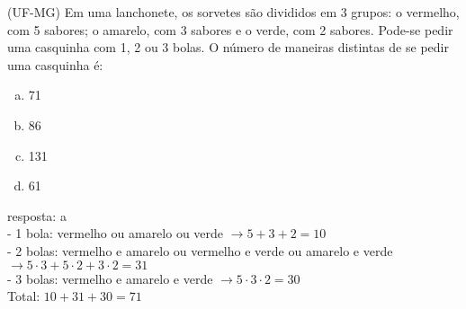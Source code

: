 \begin{ex}
 (UF-MG) Em uma lanchonete, os sorvetes são divididos em 3 grupos: o vermelho, com 5 sabores; o amarelo, com 3 sabores e o verde, com 2 sabores. Pode-se pedir uma casquinha com 1, 2 ou 3 bolas. O número de maneiras distintas de se pedir uma casquinha é:
    \begin{enumerate}[(a)]
    \item 71
    \item 86
    \item 131
    \item 61
    \end{enumerate}
      \begin{sol}
      resposta: a \\  
      - 1 bola: vermelho ou amarelo ou verde $\rightarrow 5 + 3 + 2 = 10$\\
      - 2 bolas: vermelho e amarelo ou vermelho e verde ou amarelo e verde $\rightarrow5\cdot3 + 5\cdot2 +3\cdot2 = 31$  \\
      - 3 bolas: vermelho e amarelo e verde $\rightarrow5\cdot3\cdot2=30$  \\
      Total: $10 + 31 + 30 = 71$
      
      \end{sol}
\end{ex}